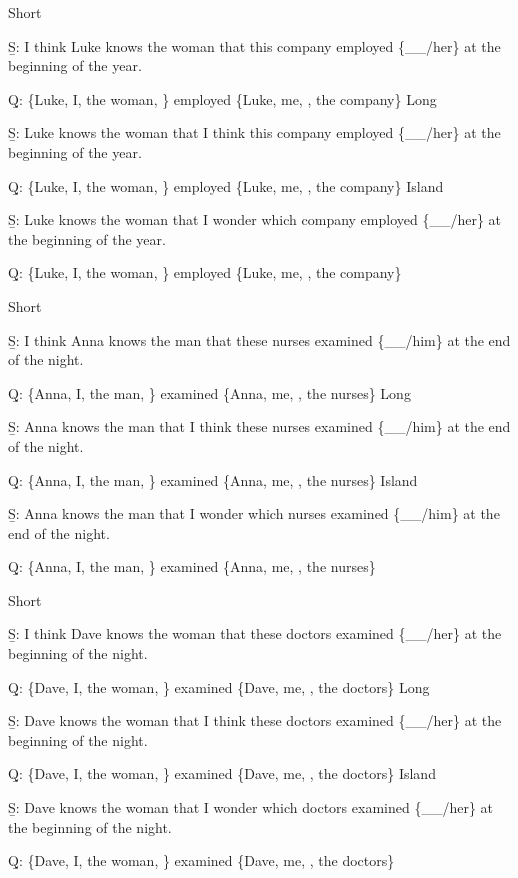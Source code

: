 \pex 
\a Short\par\nobreak
\beginsubsub 
\b{S:} I think Luke knows the woman that this company employed \{\_\_/her\} at the beginning of the year.\par\nobreak
\b{Q:} \{Luke, I, the woman, \} employed \{Luke, me, , the company\}
\endsubsub
\a Long\par\nobreak
\beginsubsub
\b{S:} Luke knows the woman that I think this company employed \{\_\_/her\} at the beginning of the year.\par\nobreak
\b{Q:} \{Luke, I, the woman, \} employed \{Luke, me, , the company\}
\endsubsub
\a Island\par\nobreak
\beginsubsub
\b{S:} Luke knows the woman that I wonder which company employed \{\_\_/her\} at the beginning of the year.\par\nobreak
\b{Q:} \{Luke, I, the woman, \} employed \{Luke, me, , the company\}
\endsubsub
\xe

\pex 
\a Short\par\nobreak
\beginsubsub 
\b{S:} I think Anna knows the man that these nurses examined \{\_\_/him\} at the end of the night.\par\nobreak
\b{Q:} \{Anna, I, the man, \} examined \{Anna, me, , the nurses\}
\endsubsub
\a Long\par\nobreak
\beginsubsub
\b{S:} Anna knows the man that I think these nurses examined \{\_\_/him\} at the end of the night.\par\nobreak
\b{Q:} \{Anna, I, the man, \} examined \{Anna, me, , the nurses\}
\endsubsub
\a Island\par\nobreak
\beginsubsub
\b{S:} Anna knows the man that I wonder which nurses examined \{\_\_/him\} at the end of the night.\par\nobreak
\b{Q:} \{Anna, I, the man, \} examined \{Anna, me, , the nurses\}
\endsubsub
\xe

\pex 
\a Short\par\nobreak
\beginsubsub 
\b{S:} I think Dave knows the woman that these doctors examined \{\_\_/her\} at the beginning of the night.\par\nobreak
\b{Q:} \{Dave, I, the woman, \} examined \{Dave, me, , the doctors\}
\endsubsub
\a Long\par\nobreak
\beginsubsub
\b{S:} Dave knows the woman that I think these doctors examined \{\_\_/her\} at the beginning of the night.\par\nobreak
\b{Q:} \{Dave, I, the woman, \} examined \{Dave, me, , the doctors\}
\endsubsub
\a Island\par\nobreak
\beginsubsub
\b{S:} Dave knows the woman that I wonder which doctors examined \{\_\_/her\} at the beginning of the night.\par\nobreak
\b{Q:} \{Dave, I, the woman, \} examined \{Dave, me, , the doctors\}
\endsubsub
\xe


